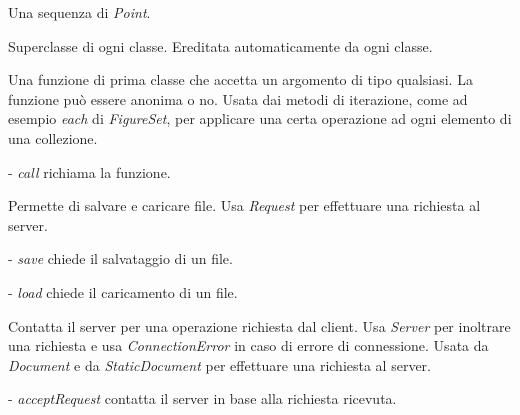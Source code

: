Una sequenza di \textit{Point}.

Superclasse di ogni classe.
Ereditata automaticamente da ogni classe.

Una funzione di prima classe che accetta un argomento di tipo qualsiasi. La funzione pu\`o essere anonima o no.
Usata dai metodi di iterazione, come ad esempio \textit{each} di \textit{FigureSet}, per applicare una certa operazione ad ogni elemento di una collezione.
\begin{elencopuntato}[\normindent]
\item[-] \textit{call} richiama la funzione.
\end{elencopuntato}

Permette di salvare e caricare file.
Usa \textit{Request} per effettuare una richiesta al server.
\begin{elencopuntato}[\normindent]
\item[-] \textit{save} chiede il salvataggio di un file.
\item[-] \textit{load} chiede il caricamento di un file.
\end{elencopuntato}

Contatta il server per una operazione richiesta dal client.
Usa \textit{Server} per inoltrare una richiesta e usa \textit{ConnectionError} in caso di errore di connessione.
Usata da \textit{Document} e da \textit{StaticDocument} per effettuare una richiesta al server.
\begin{elencopuntato}[\normindent]
\item[-] \textit{acceptRequest} contatta il server in base alla richiesta ricevuta.
\end{elencopuntato}


